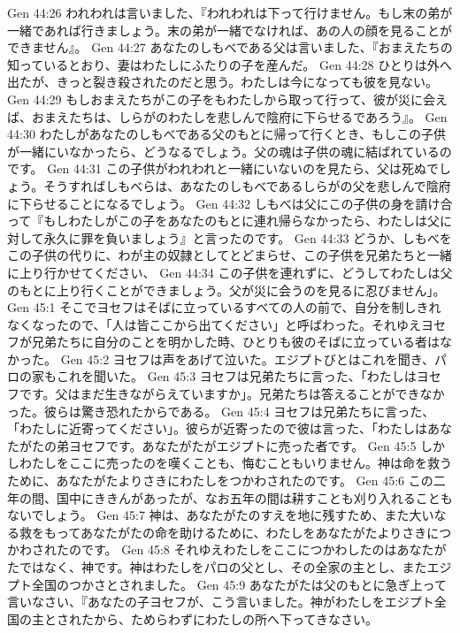 Gen 44:26  われわれは言いました、『われわれは下って行けません。もし末の弟が一緒であれば行きましょう。末の弟が一緒でなければ、あの人の顔を見ることができません』。
Gen 44:27  あなたのしもべである父は言いました、『おまえたちの知っているとおり、妻はわたしにふたりの子を産んだ。
Gen 44:28  ひとりは外へ出たが、きっと裂き殺されたのだと思う。わたしは今になっても彼を見ない。
Gen 44:29  もしおまえたちがこの子をもわたしから取って行って、彼が災に会えば、おまえたちは、しらがのわたしを悲しんで陰府に下らせるであろう』。
Gen 44:30  わたしがあなたのしもべである父のもとに帰って行くとき、もしこの子供が一緒にいなかったら、どうなるでしょう。父の魂は子供の魂に結ばれているのです。
Gen 44:31  この子供がわれわれと一緒にいないのを見たら、父は死ぬでしょう。そうすればしもべらは、あなたのしもべであるしらがの父を悲しんで陰府に下らせることになるでしょう。
Gen 44:32  しもべは父にこの子供の身を請け合って『もしわたしがこの子をあなたのもとに連れ帰らなかったら、わたしは父に対して永久に罪を負いましょう』と言ったのです。
Gen 44:33  どうか、しもべをこの子供の代りに、わが主の奴隷としてとどまらせ、この子供を兄弟たちと一緒に上り行かせてください、
Gen 44:34  この子供を連れずに、どうしてわたしは父のもとに上り行くことができましょう。父が災に会うのを見るに忍びません」。
Gen 45:1  そこでヨセフはそばに立っているすべての人の前で、自分を制しきれなくなったので、「人は皆ここから出てください」と呼ばわった。それゆえヨセフが兄弟たちに自分のことを明かした時、ひとりも彼のそばに立っている者はなかった。
Gen 45:2  ヨセフは声をあげて泣いた。エジプトびとはこれを聞き、パロの家もこれを聞いた。
Gen 45:3  ヨセフは兄弟たちに言った、「わたしはヨセフです。父はまだ生きながらえていますか」。兄弟たちは答えることができなかった。彼らは驚き恐れたからである。
Gen 45:4  ヨセフは兄弟たちに言った、「わたしに近寄ってください」。彼らが近寄ったので彼は言った、「わたしはあなたがたの弟ヨセフです。あなたがたがエジプトに売った者です。
Gen 45:5  しかしわたしをここに売ったのを嘆くことも、悔むこともいりません。神は命を救うために、あなたがたよりさきにわたしをつかわされたのです。
Gen 45:6  この二年の間、国中にききんがあったが、なお五年の間は耕すことも刈り入れることもないでしょう。
Gen 45:7  神は、あなたがたのすえを地に残すため、また大いなる救をもってあなたがたの命を助けるために、わたしをあなたがたよりさきにつかわされたのです。
Gen 45:8  それゆえわたしをここにつかわしたのはあなたがたではなく、神です。神はわたしをパロの父とし、その全家の主とし、またエジプト全国のつかさとされました。
Gen 45:9  あなたがたは父のもとに急ぎ上って言いなさい、『あなたの子ヨセフが、こう言いました。神がわたしをエジプト全国の主とされたから、ためらわずにわたしの所へ下ってきなさい。
